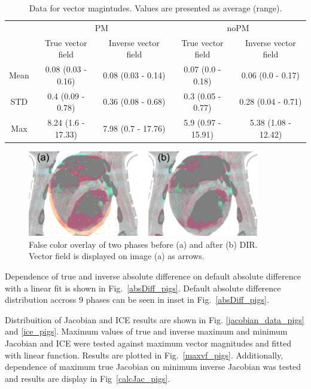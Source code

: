 \documentclass[type=dr, dr=rernat, accentcolor=tud7b,colorbacktitle, bigchapter, openright, twoside, 12pt ]{tudthesis}
\begin{document}
\begin{table}[H]
  \centering
  \caption{Data for vector magintudes. Values are presented as average (range).}
  \begin{tabular}{c|c|c|c|c}
	    & \multicolumn{2}{|c|}{PM} & \multicolumn{2}{|c|}{noPM} \\
  
            & True vector field   & Inverse vector field   & True vector field  & Inverse vector field \\
       \hline
	Mean & 0.08 (0.03 - 0.16) & 0.08 (0.03 - 0.14) & 0.07 (0.0 - 0.18)  & 0.06 (0.0 - 0.17) \\ 
	STD  & 0.4 (0.09 - 0.78)  & 0.36 (0.08 - 0.68) & 0.3 (0.05 - 0.77)  & 0.28 (0.04 - 0.71) \\ 
	Max  & 8.24 (1.6 - 17.33) & 7.98 (0.7 - 17.76) & 5.9 (0.97 - 15.91) & 5.38 (1.08 - 12.42) \\ 
    \hline\hline
  \end{tabular}
  \label{tab:vectordata_pig}
\end{table}

\begin{figure}[H]
	\begin{center}		
		\includegraphics[width=0.9\textwidth]{./Images/exampleReg_pigs.png}
		\caption{False color overlay of two phases before (a) and after (b) DIR. Vector field is displayed on image (a) as arrows.}
		\label{exampleReg_pigs}
	\end{center}
\end{figure}

Dependence of true and inverse absolute difference on default absolute difference with a linear fit is shown in Fig.~\ref{absDiff_pigs}. Default absolute difference distribution accross 9 phases can be seen in inset in Fig.~\ref{absDiff_pigs}.

Distribuition of Jacobian and ICE results are shown in Fig. \ref{jacobian_data_pigs} and \ref{ice_pigs}. Maximum values of true and inverse maximum and minimum Jacobian and ICE were tested 
against maximum vector magnitudes and fitted with linear function. Results are plotted in Fig.~\ref{maxvf_pigs}.
Additionally, dependence of maximum true Jacobian on minimum inverse Jacobian was tested and results are display in Fig~\ref{calcJac_pigs}.
\end{document}
